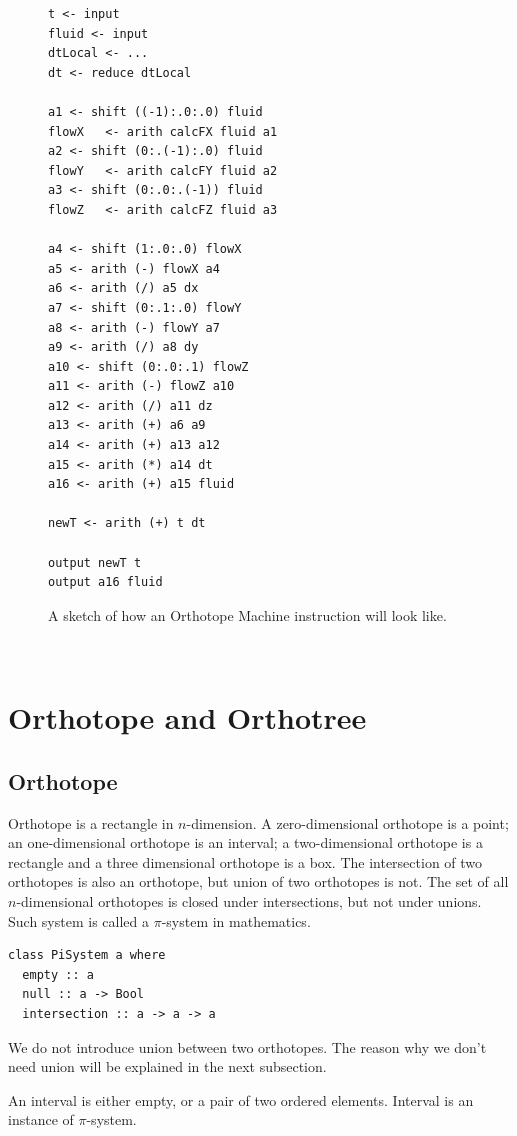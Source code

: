 \documentclass[twocolumn]{article}
\begin{document}
\begin{figure}
\begin{verbatim}
t <- input 
fluid <- input
dtLocal <- ...
dt <- reduce dtLocal

a1 <- shift ((-1):.0:.0) fluid
flowX   <- arith calcFX fluid a1
a2 <- shift (0:.(-1):.0) fluid
flowY   <- arith calcFY fluid a2
a3 <- shift (0:.0:.(-1)) fluid
flowZ   <- arith calcFZ fluid a3

a4 <- shift (1:.0:.0) flowX
a5 <- arith (-) flowX a4
a6 <- arith (/) a5 dx
a7 <- shift (0:.1:.0) flowY
a8 <- arith (-) flowY a7
a9 <- arith (/) a8 dy
a10 <- shift (0:.0:.1) flowZ
a11 <- arith (-) flowZ a10
a12 <- arith (/) a11 dz
a13 <- arith (+) a6 a9
a14 <- arith (+) a13 a12
a15 <- arith (*) a14 dt
a16 <- arith (+) a15 fluid

newT <- arith (+) t dt

output newT t
output a16 fluid
\end{verbatim}
  \caption{A sketch of how an Orthotope Machine instruction will look
    like.}\label{FigureOMInst}
\end{figure}

\newpage
~
\newpage
~
\clearpage


\section{Orthotope and Orthotree}
\subsection{Orthotope}

Orthotope is a rectangle in $n$-dimension. A zero-dimensional orthotope is a
point; an one-dimensional orthotope is an interval; a two-dimensional
orthotope is a rectangle and a three dimensional orthotope is a box. The
intersection of two orthotopes is also an orthotope, but union of two
orthotopes is not. The set of all $n$-dimensional orthotopes is closed under
intersections, but not under unions. Such system is called a $\pi$-system in
mathematics.

\begin{verbatim}
class PiSystem a where
  empty :: a
  null :: a -> Bool
  intersection :: a -> a -> a
\end{verbatim}

We do not introduce union between two orthotopes. The reason why we don't need
union will be explained in the next subsection.

An interval is either empty, or a pair of two ordered elements. Interval is an
instance of $\pi$-system.
\end{document}
